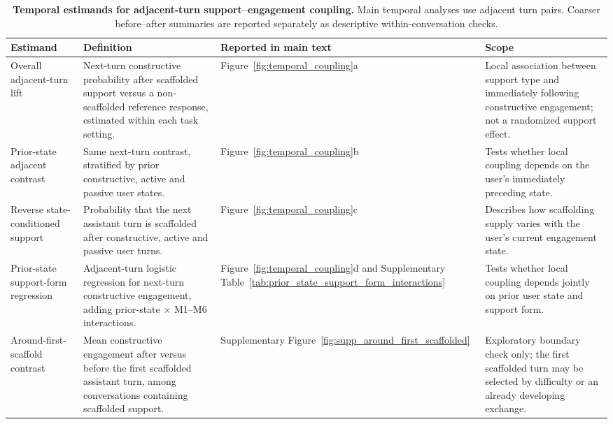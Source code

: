 \begin{table}[p]
\tiny
\centering
\caption{\textbf{Temporal estimands for adjacent-turn support--engagement coupling.} Main temporal analyses use adjacent turn pairs. Coarser before--after summaries are reported separately as descriptive within-conversation checks.}
\label{tab:temporal_estimands}
\setlength{\tabcolsep}{4pt}
\renewcommand{\arraystretch}{1.02}
\begin{tabularx}{\textwidth}{>{\raggedright\arraybackslash}p{}>{\raggedright\arraybackslash}p{}>{\raggedright\arraybackslash}p{}>{\raggedright\arraybackslash}X}
\toprule
Estimand & Definition & Reported in main text & Scope \\
\midrule
Overall adjacent-turn lift & Next-turn constructive probability after scaffolded support versus a non-scaffolded reference response, estimated within each task setting. & Figure~\ref{fig:temporal_coupling}a & Local association between support type and immediately following constructive engagement; not a randomized support effect. \\
Prior-state adjacent contrast & Same next-turn contrast, stratified by prior constructive, active and passive user states. & Figure~\ref{fig:temporal_coupling}b & Tests whether local coupling depends on the user's immediately preceding state. \\
Reverse state-conditioned support & Probability that the next assistant turn is scaffolded after constructive, active and passive user turns. & Figure~\ref{fig:temporal_coupling}c & Describes how scaffolding supply varies with the user's current engagement state. \\
Prior-state support-form regression & Adjacent-turn logistic regression for next-turn constructive engagement, adding prior-state $\times$ M1--M6 interactions. & Figure~\ref{fig:temporal_coupling}d and Supplementary Table~\ref{tab:prior_state_support_form_interactions} & Tests whether local coupling depends jointly on prior user state and support form. \\
Around-first-scaffold contrast & Mean constructive engagement after versus before the first scaffolded assistant turn, among conversations containing scaffolded support. & Supplementary Figure~\ref{fig:supp_around_first_scaffolded} & Exploratory boundary check only; the first scaffolded turn may be selected by difficulty or an already developing exchange. \\
\bottomrule
\end{tabularx}
\end{table}
